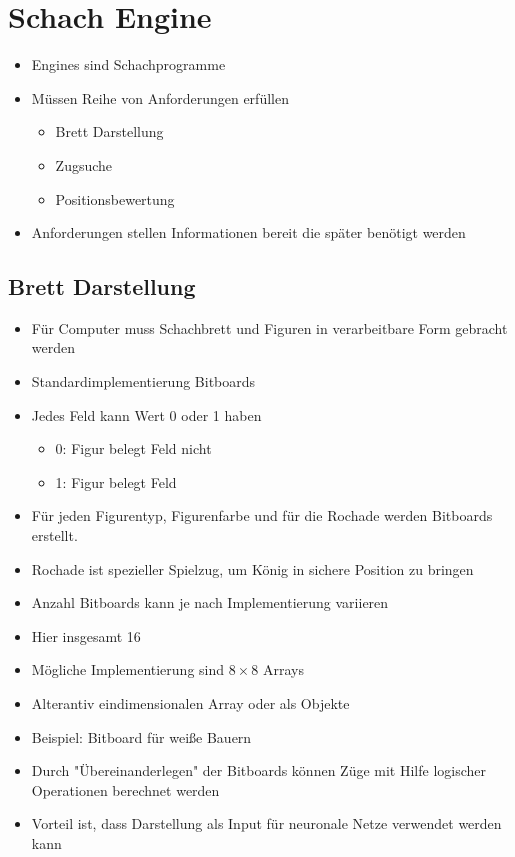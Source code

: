 \section{Schach Engine}

\begin{itemize}[leftmargin=*]
\item Engines sind Schachprogramme
\item Müssen Reihe von Anforderungen erfüllen
\begin{itemize}
\item Brett Darstellung
\item Zugsuche
\item Positionsbewertung
\end{itemize}
\item Anforderungen stellen Informationen bereit die später benötigt werden
\end{itemize}

\newpage

\subsection{Brett Darstellung}

\begin{itemize}[leftmargin=*]
\item Für Computer muss Schachbrett und Figuren in verarbeitbare Form gebracht werden
\item Standardimplementierung Bitboards
\item Jedes Feld kann Wert 0 oder 1 haben
	\begin{itemize}[leftmargin=*]
		\item 0: Figur belegt Feld nicht
		\item 1: Figur belegt Feld
	\end{itemize}
\item Für jeden Figurentyp, Figurenfarbe und für die Rochade werden Bitboards erstellt.
\item Rochade ist spezieller Spielzug, um König in sichere Position zu bringen
\item Anzahl Bitboards kann je nach Implementierung variieren
\item Hier insgesamt 16
\end{itemize}

\newpage

\begin{itemize}[leftmargin=*]
\item Mögliche Implementierung sind $8 \times 8$ Arrays
\item Alterantiv eindimensionalen Array oder als Objekte
\item Beispiel: Bitboard für weiße Bauern
\item Durch "Übereinanderlegen" der Bitboards können Züge mit Hilfe logischer Operationen berechnet werden
\item Vorteil ist, dass Darstellung als Input für neuronale Netze verwendet werden kann
\end{itemize}

